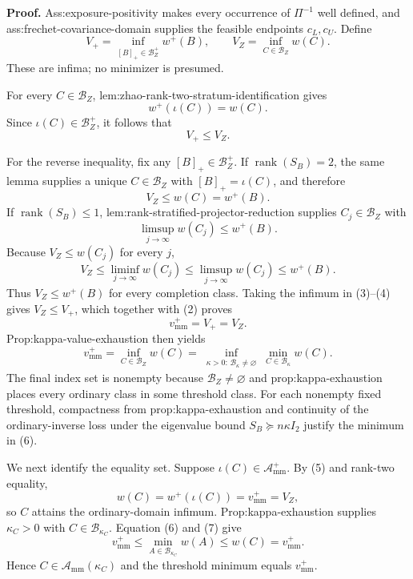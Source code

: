 \textbf{Proof.}
Ass:exposure-positivity makes every occurrence of \(\Pi^{-1}\) well defined, and ass:frechet-covariance-domain supplies the feasible endpoints \(c_L,c_U\).  Define
\[
V_+=\inf_{[B]_+\in\mathcal B_Z^+}w^+(B),
\qquad
V_Z=\inf_{C\in\mathcal B_Z}w(C).                                  \tag{1}
\]
These are infima; no minimizer is presumed.

For every \(C\in\mathcal B_Z\), lem:zhao-rank-two-stratum-identification gives
\[
w^+(\iota(C))=w(C).
\]
Since \(\iota(C)\in\mathcal B_Z^+\), it follows that
\[
V_+\le V_Z.                                                        \tag{2}
\]

For the reverse inequality, fix any \([B]_+\in\mathcal B_Z^+\).  If \(\operatorname{rank}(S_B)=2\), the same lemma supplies a unique \(C\in\mathcal B_Z\) with \([B]_+=\iota(C)\), and therefore
\[
V_Z\le w(C)=w^+(B).                                                \tag{3}
\]
If \(\operatorname{rank}(S_B)\le1\), lem:rank-stratified-projector-reduction supplies \(C_j\in\mathcal B_Z\) with
\[
\limsup_{j\to\infty}w(C_j)\le w^+(B).
\]
Because \(V_Z\le w(C_j)\) for every \(j\),
\[
V_Z\le\liminf_{j\to\infty}w(C_j)
\le\limsup_{j\to\infty}w(C_j)
\le w^+(B).                                                        \tag{4}
\]
Thus \(V_Z\le w^+(B)\) for every completion class.  Taking the infimum in (3)--(4) gives \(V_Z\le V_+\), which together with (2) proves
\[
v_{\mathrm{mm}}^+=V_+=V_Z.                                       \tag{5}
\]
Prop:kappa-value-exhaustion then yields
\[
v_{\mathrm{mm}}^+
=\inf_{C\in\mathcal B_Z}w(C)
=\inf_{\substack{\kappa>0:\,\mathcal B_\kappa\ne\varnothing}}
\min_{C\in\mathcal B_\kappa}w(C).                               \tag{6}
\]
The final index set is nonempty because \(\mathcal B_Z\ne\varnothing\) and prop:kappa-exhaustion places every ordinary class in some threshold class.  For each nonempty fixed threshold, compactness from prop:kappa-exhaustion and continuity of the ordinary-inverse loss under the eigenvalue bound \(S_B\succeq n\kappa I_2\) justify the minimum in (6).

We next identify the equality set.  Suppose \(\iota(C)\in\mathcal A_{\mathrm{mm}}^+\).  By (5) and rank-two equality,
\[
w(C)=w^+(\iota(C))=v_{\mathrm{mm}}^+=V_Z,                          \tag{7}
\]
so \(C\) attains the ordinary-domain infimum.  Prop:kappa-exhaustion supplies \(\kappa_C>0\) with \(C\in\mathcal B_{\kappa_C}\).  Equation (6) and (7) give
\[
v_{\mathrm{mm}}^+
\le\min_{A\in\mathcal B_{\kappa_C}}w(A)
\le w(C)=v_{\mathrm{mm}}^+.
\]
Hence \(C\in\mathcal A_{\mathrm{mm}}(\kappa_C)\) and the threshold minimum equals \(v_{\mathrm{mm}}^+\).

